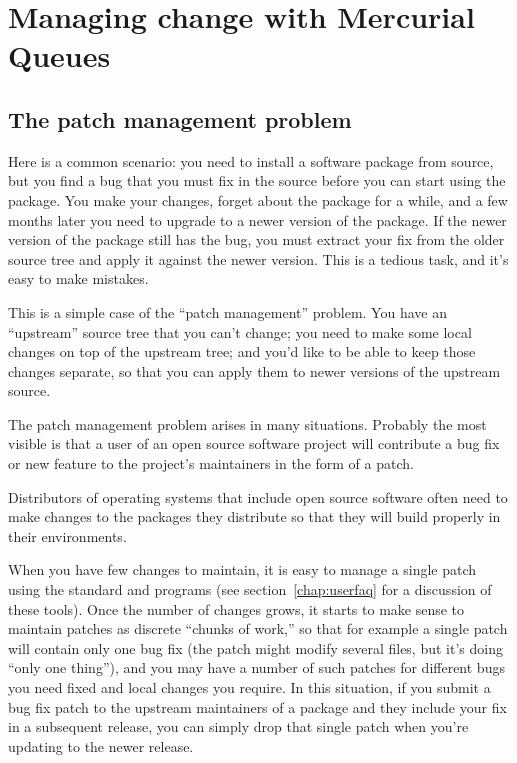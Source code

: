 \chapter{Managing change with Mercurial Queues}
\label{chap:mq}

\section{The patch management problem}
\label{chap:userfaq-mgmt}

Here is a common scenario: you need to install a software package from
source, but you find a bug that you must fix in the source before you
can start using the package.  You make your changes, forget about the
package for a while, and a few months later you need to upgrade to a
newer version of the package.  If the newer version of the package
still has the bug, you must extract your fix from the older source
tree and apply it against the newer version.  This is a tedious task,
and it's easy to make mistakes.

This is a simple case of the ``patch management'' problem.  You have
an ``upstream'' source tree that you can't change; you need to make
some local changes on top of the upstream tree; and you'd like to be
able to keep those changes separate, so that you can apply them to
newer versions of the upstream source.

The patch management problem arises in many situations.  Probably the
most visible is that a user of an open source software project will
contribute a bug fix or new feature to the project's maintainers in the
form of a patch.

Distributors of operating systems that include open source software
often need to make changes to the packages they distribute so that
they will build properly in their environments.

When you have few changes to maintain, it is easy to manage a single
patch using the standard  and  programs
(see section~\ref{chap:userfaq} for a discussion of these tools).
Once the number of changes grows, it starts to make sense to maintain
patches as discrete ``chunks of work,'' so that for example a single
patch will contain only one bug fix (the patch might modify several
files, but it's doing ``only one thing''), and you may have a number
of such patches for different bugs you need fixed and local changes
you require.  In this situation, if you submit a bug fix patch to the
upstream maintainers of a package and they include your fix in a
subsequent release, you can simply drop that single patch when you're
updating to the newer release.


